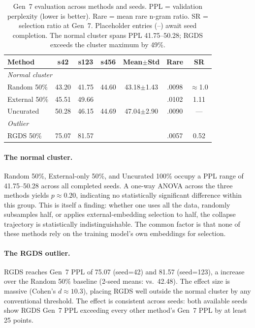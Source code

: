 \begin{table}[t]
\centering
\small
\begin{tabular}{lcccccc}
\toprule
\textbf{Method} & \textbf{s42} & \textbf{s123} & \textbf{s456} & \textbf{Mean$\pm$Std} & \textbf{Rare} & \textbf{SR} \\
\midrule
\multicolumn{7}{l}{\textit{Normal cluster}} \\
Random 50\% & 43.20 & 41.75 & 44.60 & 43.18$\pm$1.43 & .0098 & $\approx$1.0 \\
External 50\% & 45.51 & 49.66 & \placeholder{--} & \placeholder{--} & .0102 & 1.11 \\
Uncurated & 50.28 & 46.15 & 44.69 & 47.04$\pm$2.90 & .0090 & --- \\
\midrule
\multicolumn{7}{l}{\textit{Outlier}} \\
RGDS 50\% & 75.07 & 81.57 & \placeholder{--} & \placeholder{--} & .0057 & 0.52 \\
\bottomrule
\end{tabular}
\caption{Gen~7 evaluation across methods and seeds. PPL = validation perplexity (lower is better). Rare = mean rare n-gram ratio. SR = selection ratio at Gen~7. Placeholder entries (--) await seed completion. The normal cluster spans PPL 41.75--50.28; RGDS exceeds the cluster maximum by 49\%.}
\label{tab:gen7_summary}
\end{table}

\paragraph{The normal cluster.} Random 50\%, External-only 50\%, and Uncurated 100\% occupy a PPL range of 41.75--50.28 across all completed seeds. A one-way ANOVA across the three methods yields $p \approx 0.20$, indicating no statistically significant difference within this group. This is itself a finding: whether one uses all the data, randomly subsamples half, or applies external-embedding selection to half, the collapse trajectory is statistically indistinguishable. The common factor is that none of these methods rely on the training model's own embeddings for selection.

\paragraph{The RGDS outlier.} RGDS reaches Gen~7 PPL of 75.07 (seed=42) and 81.57 (seed=123), a  increase over the Random 50\% baseline (2-seed means:  vs.\ 42.48). The effect size is massive (Cohen's $d \approx 10.3$), placing RGDS well outside the normal cluster by any conventional threshold. The effect is consistent across seeds: both available seeds show RGDS Gen~7 PPL exceeding every other method's Gen~7 PPL by at least 25 points.

